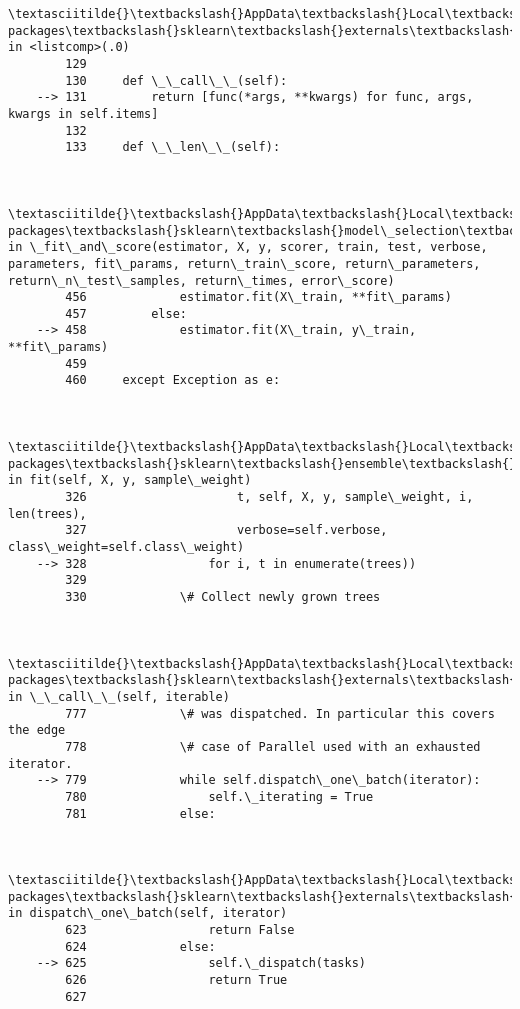 \documentclass[11pt]{article}
\begin{document}
\begin{Verbatim}[commandchars=\\\{\}]
        \textasciitilde{}\textbackslash{}AppData\textbackslash{}Local\textbackslash{}Continuum\textbackslash{}anaconda3\textbackslash{}lib\textbackslash{}site-packages\textbackslash{}sklearn\textbackslash{}externals\textbackslash{}joblib\textbackslash{}parallel.py in <listcomp>(.0)
        129 
        130     def \_\_call\_\_(self):
    --> 131         return [func(*args, **kwargs) for func, args, kwargs in self.items]
        132 
        133     def \_\_len\_\_(self):
    

        \textasciitilde{}\textbackslash{}AppData\textbackslash{}Local\textbackslash{}Continuum\textbackslash{}anaconda3\textbackslash{}lib\textbackslash{}site-packages\textbackslash{}sklearn\textbackslash{}model\_selection\textbackslash{}\_validation.py in \_fit\_and\_score(estimator, X, y, scorer, train, test, verbose, parameters, fit\_params, return\_train\_score, return\_parameters, return\_n\_test\_samples, return\_times, error\_score)
        456             estimator.fit(X\_train, **fit\_params)
        457         else:
    --> 458             estimator.fit(X\_train, y\_train, **fit\_params)
        459 
        460     except Exception as e:
    

        \textasciitilde{}\textbackslash{}AppData\textbackslash{}Local\textbackslash{}Continuum\textbackslash{}anaconda3\textbackslash{}lib\textbackslash{}site-packages\textbackslash{}sklearn\textbackslash{}ensemble\textbackslash{}forest.py in fit(self, X, y, sample\_weight)
        326                     t, self, X, y, sample\_weight, i, len(trees),
        327                     verbose=self.verbose, class\_weight=self.class\_weight)
    --> 328                 for i, t in enumerate(trees))
        329 
        330             \# Collect newly grown trees
    

        \textasciitilde{}\textbackslash{}AppData\textbackslash{}Local\textbackslash{}Continuum\textbackslash{}anaconda3\textbackslash{}lib\textbackslash{}site-packages\textbackslash{}sklearn\textbackslash{}externals\textbackslash{}joblib\textbackslash{}parallel.py in \_\_call\_\_(self, iterable)
        777             \# was dispatched. In particular this covers the edge
        778             \# case of Parallel used with an exhausted iterator.
    --> 779             while self.dispatch\_one\_batch(iterator):
        780                 self.\_iterating = True
        781             else:
    

        \textasciitilde{}\textbackslash{}AppData\textbackslash{}Local\textbackslash{}Continuum\textbackslash{}anaconda3\textbackslash{}lib\textbackslash{}site-packages\textbackslash{}sklearn\textbackslash{}externals\textbackslash{}joblib\textbackslash{}parallel.py in dispatch\_one\_batch(self, iterator)
        623                 return False
        624             else:
    --> 625                 self.\_dispatch(tasks)
        626                 return True
        627 
    


\end{Verbatim}
\end{document}
